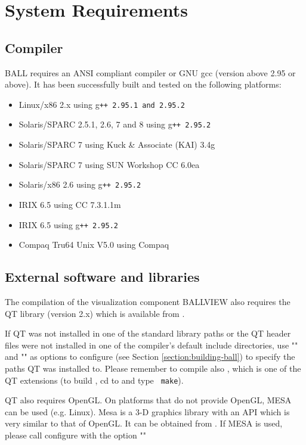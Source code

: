 \section{System Requirements}

\subsection{Compiler}
  BALL requires an ANSI compliant \CPP compiler or GNU gcc
  (version above 2.95 or above).
  It has been successfully built and tested on the following platforms:
	\begin{itemize}	
   	\item Linux/x86 2.x using g\tt{++} 2.95.1 and 2.95.2
   	\item Solaris/SPARC 2.5.1, 2.6, 7 and 8 using g\tt{++} 2.95.2
   	\item Solaris/SPARC 7 using Kuck \& Associate (KAI) \CPP 3.4g
   	\item Solaris/SPARC 7 using SUN Workshop CC 6.0ea
   	\item Solaris/x86 2.6 using g\tt{++} 2.95.2
   	\item IRIX 6.5 using CC 7.3.1.1m
   	\item IRIX 6.5 using g\tt{++} 2.95.2
   	\item Compaq Tru64 Unix V5.0 using Compaq 
 	\end{itemize}

\subsection{External software and libraries}
The compilation of the visualization component BALLVIEW also requires
the QT library (version 2.x) which is available from
.

If QT was not installed in one of the standard library paths or the
QT header files were not installed in one of the compiler's default
include directories, use "" and
"" as
options to configure (see Section \ref{section:building-ball}) to specify the paths
QT was installed to.
Please remember to compile also , which is one of the QT extensions
(to build , cd to {\tt{}} and type {\tt
make}).

QT also requires OpenGL. On platforms that do not provide OpenGL, MESA can
be used (e.g. Linux). Mesa is a 3-D graphics library with an API which is 
very similar to that of OpenGL. It can be obtained from .
If MESA is used, please call configure with the option ""

